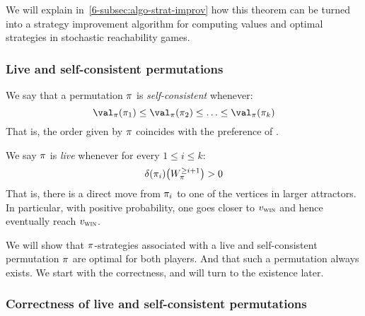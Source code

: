 We will explain in~\cref{6-subsec:algo-strat-improv} how this
theorem can be turned into a strategy improvement algorithm for
computing values and optimal strategies in stochastic reachability
games.



\subsubsection{Live and self-consistent permutations}


We say that a permutation $\pi$ is \emph{self-consistent} whenever:
\[
\val_\perm(\perm_1) \le \val_\perm(\perm_2) \le \ldots \le \val_\perm(\perm_k)
\]
That is, the order given by $\pi$ coincides with the preference of
\Eve.

We say $\pi$ is \emph{live} whenever for every $1 \le i \le k$:
\[
\delta(\pi_i)\big(W_\pi^{\ge i+1}\big)>0
\]
That is, there is a direct move from $\pi_i$ to one of the vertices
in larger attractors. In particular, with positive probability, one
goes closer to $v_{\textsc{win}}$ and hence eventually reach $v_{\textsc{win}}$.

\medskip We will show that $\pi$-strategies associated with a live
and self-consistent permutation $\pi$ are optimal for both players.
And that such a permutation always exists. We start with the
correctness, and will turn to the existence later.


\subsubsection{Correctness of live and self-consistent permutations}



